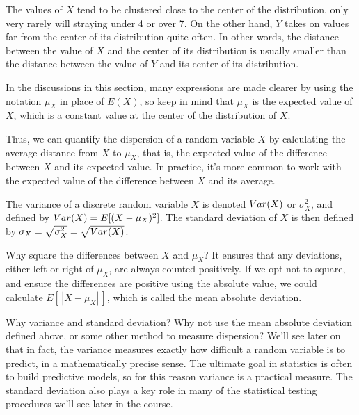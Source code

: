 The values of $X$ tend to be clustered close to the center of the distribution, only very rarely will straying under 4 or over 7. On the other hand, $Y$ takes on values far from the center of its distribution quite often. In other words, the distance between the value of $X$ and the center of its distribution is usually smaller than the distance between the value of $Y$ and its center of its distribution. 

\rmk In the discussions in this section, many expressions are made clearer by using the notation $\mu_X$ in place of $E(X)$, so keep in mind that $\mu_X$ is the expected value of $X$, which is a constant value at the center of the distribution of $X$.

\par
Thus, we can quantify the dispersion of a random variable $X$ by calculating the average distance from $X$ to $\mu_X$, that is, the expected value of the difference between $X$ and its expected value. In practice, it's more common to work with the expected value of the  difference between $X$ and its average.

\begin{defn}\label{VarianceDef} The variance of a discrete random variable $X$ is denoted $Var(X)$ or $\sigma^{2}_{X}$, and defined by $Var(X) = E[(X - \mu_X)^2]$. The standard deviation of $X$ is then defined by $\sigma_X = \sqrt{\sigma^{2}_X} = \sqrt{Var(X)}$.
\end{defn}

\par Why square the differences between $X$ and $\mu_X$? It ensures that any deviations, either left or right of $\mu_X$, are always counted positively. If we opt not to square, and ensure the differences are positive using the absolute value, we could calculate $E[\,|X-\mu_X|\,]$, which is called the mean absolute deviation.

\par Why variance and standard deviation? Why not use the mean absolute deviation defined above, or some other method to measure dispersion? We'll see later on that in fact, the variance measures exactly how difficult a random variable is to predict, in a mathematically precise sense. The ultimate goal in statistics is often to build predictive models, so for this reason variance is a practical measure. The standard deviation also plays a key role in many of the statistical testing procedures we'll see later in the course.

